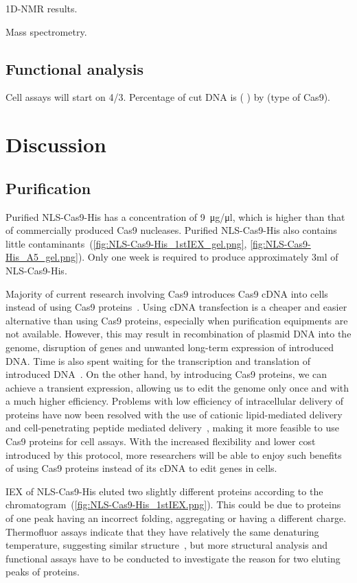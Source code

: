 \documentclass[11pt]{article}
\begin{document}
1D-NMR results.

Mass spectrometry.

\subsection{Functional analysis}
Cell assays will start on 4/3. Percentage of cut DNA is ( ) by (type of Cas9).


\newpage
\section{Discussion}

\subsection{Purification}
Purified NLS-Cas9-His has a concentration of \SI{9}{\micro\gram/\micro\litre}, which is higher than that of commercially produced Cas9 nucleases. Purified NLS-Cas9-His also contains little contaminants~(\autoref{fig:NLS-Cas9-His_1stIEX_gel.png}, \autoref{fig:NLS-Cas9-His_A5_gel.png}). Only one week is required to produce approximately 3ml of NLS-Cas9-His. 

Majority of current research involving Cas9 introduces Cas9 cDNA into cells instead of using Cas9 proteins~\citep{Kleber-Janke2000,Kleinstiver2015,Li2015}. Using cDNA transfection is a cheaper and easier alternative than using Cas9 proteins, especially when purification equipments are not available. However, this may result in recombination of plasmid DNA into the genome, disruption of genes and unwanted long-term expression of introduced DNA. Time is also spent waiting for the transcription and translation of introduced DNA~\citep{Ramakrishna2014}. On the other hand, by introducing Cas9 proteins, we can achieve a transient expression, allowing us to edit the genome only once and with a much higher efficiency. Problems with low efficiency of intracellular delivery of proteins have now been resolved with the use of cationic lipid-mediated delivery~\citep{Zuris2014} and cell-penetrating peptide mediated delivery~\citep{Ramakrishna2014}, making it more feasible to use Cas9 proteins for cell assays. With the increased flexibility and lower cost introduced by this protocol, more researchers will be able to enjoy such benefits of using Cas9 proteins instead of its cDNA to edit genes in cells.

IEX of NLS-Cas9-His eluted two slightly different proteins according to the chromatogram~(\autoref{fig:NLS-Cas9-His_1stIEX.png}). This could be due to proteins of one peak having an incorrect folding, aggregating or having a different charge. Thermofluor assays indicate that they have relatively the same denaturing temperature, suggesting similar structure~\citep{Ericsson2006}, but more structural analysis and functional assays have to be conducted to investigate the reason for two eluting peaks of proteins.
\end{document}
